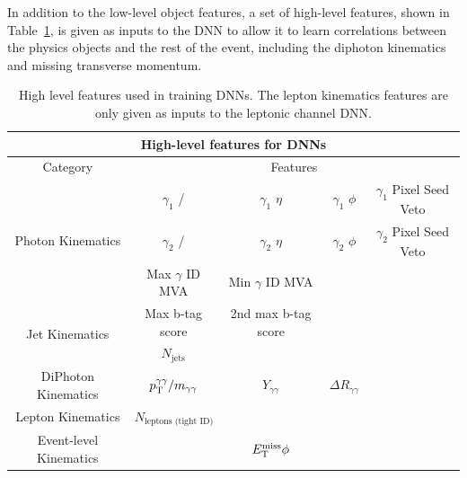 In addition to the low-level object features, a set of high-level features, shown in Table~\ref{tab:tth_hlf_dnn}, is given as inputs to the DNN to allow it to learn correlations between the physics objects and the rest of the event, including the diphoton kinematics and missing transverse momentum.
\begin{table}[h] \scriptsize
	\centering
	\caption{High level features used in training DNNs. The lepton kinematics features are only given as inputs to the leptonic channel DNN.} 
	\renewcommand{\arraystretch}{1.5}
	\begin{tabular}{c| c c c c}
		\multicolumn{5}{c}{High-level features for DNNs} \\ \hline
		Category & \multicolumn{4}{c}{Features} \\ \hline
		\multirow{3}{*}{Photon Kinematics} & $\gamma_1$ \pT/\mgg & $\gamma_1$ $\eta$ & $\gamma_1$ $\phi$ & $\gamma_1$ Pixel Seed Veto \\
		& $\gamma_2$ \pT/\mgg & $\gamma_2$ $\eta$ & $\gamma_2$ $\phi$ & $\gamma_2$ Pixel Seed Veto \\
		& Max $\gamma$ ID MVA & Min $\gamma$ ID MVA & & \\ \hline
		\multirow{2}{*}{Jet Kinematics} & Max b-tag score & 2nd max b-tag score & & \\
		& $N_{\text{jets}}$ & & & \\ \hline
		\multirow{1}{*}{DiPhoton Kinematics} & $p_{\mathrm{T}}^{\gamma \gamma} / m_{\gamma\gamma}$ & $Y_{\gamma \gamma}$ & $\Delta R_{\gamma \gamma}$ & \\ \hline
		\multirow{1}{*}{Lepton Kinematics} & $N_{\text{leptons (tight ID)}}$ & & & \\ \hline
		\multirow{1}{*}{Event-level Kinematics} & \met & $E_{\text{T}}^{\text{miss}} \phi$ & & \\ \hline
	\end{tabular}
	\label{tab:tth_hlf_dnn}
\end{table}

